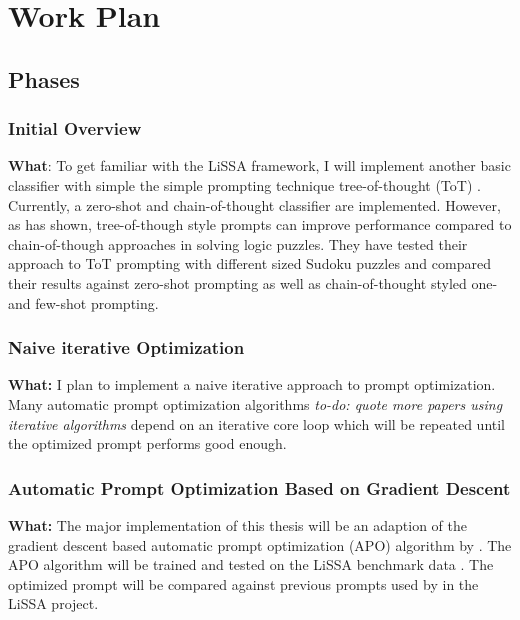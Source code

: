 \chapter{Work Plan}

\section{Phases}
\subsection{Initial Overview}
\label{phase_initial_overview}

\textbf{What}: To get familiar with the LiSSA framework, I will implement another basic classifier with simple the simple prompting technique tree-of-thought (ToT) \cite{long2023LargeLanguage}. 
Currently, a zero-shot and chain-of-thought classifier are implemented. However, as \citeauthor{long2023LargeLanguage} has shown, tree-of-though style prompts can improve performance compared to chain-of-though approaches in solving logic puzzles. They have tested their approach to ToT prompting with different sized Sudoku puzzles and compared their results against zero-shot prompting as well as chain-of-thought styled one- and few-shot prompting. 


\subsection{Naive iterative Optimization}
\label{phase_naive_iterative}
\textbf{What:} I plan to implement a naive iterative approach to prompt optimization. Many automatic prompt optimization algorithms \citeiterative \textit{to-do: quote more papers using iterative algorithms} depend on an iterative core loop which will be repeated until the optimized prompt performs good enough.

\subsection{Automatic Prompt Optimization Based on Gradient Descent}
\label{phase_gradient_descent}
\textbf{What:} The major implementation of this thesis will be an adaption of the gradient descent based automatic prompt optimization (APO) algorithm by . 
The APO algorithm will be trained and tested on the LiSSA benchmark data \cite{fuchss2022ArDoCoBenchmark}. The optimized prompt will be compared against previous prompts used by \citeauthor{fuchss2025LiSSAGeneric} in the LiSSA project.




